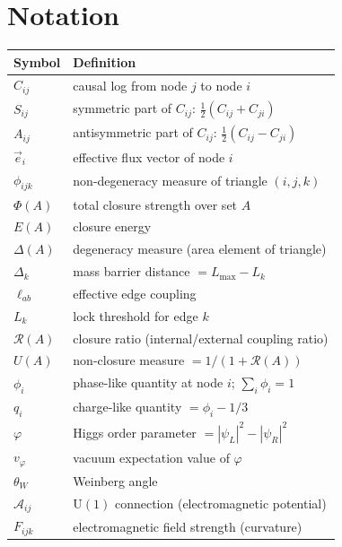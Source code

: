 \section{Notation}
\label{sec:notation}

\begin{center}
\begin{tabular}{ll}
\toprule
Symbol & Definition \\
\midrule
$C_{ij}$           & causal log from node $j$ to node $i$ \\
$S_{ij}$           & symmetric part of $C_{ij}$: $\tfrac{1}{2}(C_{ij}+C_{ji})$ \\
$A_{ij}$           & antisymmetric part of $C_{ij}$: $\tfrac{1}{2}(C_{ij}-C_{ji})$ \\
$\vec{e}_i$        & effective flux vector of node $i$ \\
$\phi_{ijk}$       & non-degeneracy measure of triangle $(i,j,k)$ \\
$\Phi(A)$          & total closure strength over set $A$ \\
$E(A)$             & closure energy \\
$\Delta(A)$        & degeneracy measure (area element of triangle) \\
$\Delta_k$         & mass barrier distance $= L_{\max}-L_k$ \\
$\ell_{ab}$        & effective edge coupling \\
$L_k$              & lock threshold for edge $k$ \\
$\mathcal{R}(A)$   & closure ratio (internal/external coupling ratio) \\
$U(A)$             & non-closure measure $= 1/(1+\mathcal{R}(A))$ \\
$\phi_i$           & phase-like quantity at node $i$; $\sum_i \phi_i = 1$ \\
$q_i$              & charge-like quantity $= \phi_i - 1/3$ \\
$\varphi$          & Higgs order parameter $= |\psi_L|^2 - |\psi_R|^2$ \\
$v_\varphi$        & vacuum expectation value of $\varphi$ \\
$\theta_W$         & Weinberg angle \\
$\mathcal{A}_{ij}$ & $\mathrm{U}(1)$ connection (electromagnetic potential) \\
$F_{ijk}$          & electromagnetic field strength (curvature) \\
\bottomrule
\end{tabular}
\end{center}
